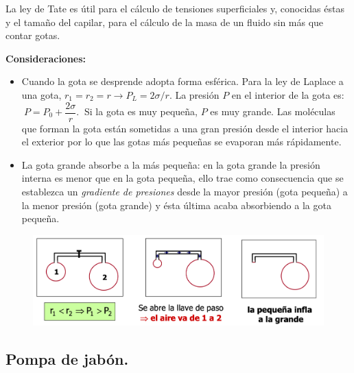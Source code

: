 La ley de Tate es útil para el cálculo de tensiones superficiales y, conocidas éstas y el tamaño del capilar, para el cálculo de la masa de un fluido sin más que contar gotas.

\vspace{3mm}\textbf{Consideraciones:}
\begin{itemize}
\vspace{-2mm}\item Cuando la gota se desprende adopta forma esférica. Para la ley de Laplace a una gota, $r_1=r_2=r\to P_L=2\sigma /r$. La presión $P$ en el interior de la gota es: $\ P=P_0+\dfrac{2\sigma}{r}.\ $ Si la gota es muy pequeña, $P$ es muy grande. Las moléculas que forman la gota están sometidas a una gran presión desde el interior hacia el exterior por lo que las gotas más pequeñas se evaporan más rápidamente.
\vspace{-2mm}\item La gota grande absorbe a la más pequeña:  en la gota grande la presión interna es menor que en la gota pequeña, ello trae como consecuencia que se establezca un \emph{gradiente de presiones} desde la mayor presión (gota pequeña) a la menor presión (gota grande) y ésta última acaba absorbiendo a la gota pequeña.
\end{itemize}

\begin{figure}[H]
	\centering
	\includegraphics[width=1\textwidth]{imagenes/imagenes08/T08IM18.png}
\end{figure}


\subsection{Pompa de jabón.}

